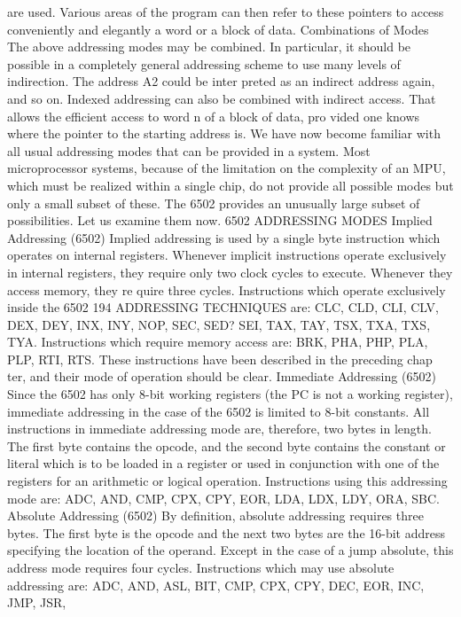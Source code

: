 are used. Various areas of the program can then refer to these
pointers to access conveniently and elegantly a word or a block of
data.
Combinations of Modes
The above addressing modes may be combined. In particular, it
should be possible in a completely general addressing scheme to
use many levels of indirection. The address A2 could be inter
preted as an indirect address again, and so on.
Indexed addressing can also be combined with indirect access.
That allows the efficient access to word n of a block of data, pro
vided one knows where the pointer to the starting address is.
We have now become familiar with all usual addressing modes
that can be provided in a system. Most microprocessor systems,
because of the limitation on the complexity of an MPU, which
must be realized within a single chip, do not provide all possible
modes but only a small subset of these. The 6502 provides an
unusually large subset of possibilities. Let us examine them now.
6502 ADDRESSING MODES
Implied Addressing (6502)
Implied addressing is used by a single byte instruction which
operates on internal registers. Whenever implicit instructions
operate exclusively in internal registers, they require only two
clock cycles to execute. Whenever they access memory, they re
quire three cycles.
Instructions which operate exclusively inside the 6502
194
ADDRESSING TECHNIQUES
are: CLC, CLD, CLI, CLV, DEX, DEY, INX, INY, NOP, SEC, SED?
SEI, TAX, TAY, TSX, TXA, TXS, TYA.
Instructions which require memory access are: BRK, PHA,
PHP, PLA, PLP, RTI, RTS.
These instructions have been described in the preceding chap
ter, and their mode of operation should be clear.
Immediate Addressing (6502)
Since the 6502 has only 8-bit working registers (the PC is not a
working register), immediate addressing in the case of the 6502 is
limited to 8-bit constants. All instructions in immediate addressing
mode are, therefore, two bytes in length. The first byte contains
the opcode, and the second byte contains the constant or literal
which is to be loaded in a register or used in conjunction with one
of the registers for an arithmetic or logical operation.
Instructions using this addressing mode are: ADC, AND, CMP,
CPX, CPY, EOR, LDA, LDX, LDY, ORA, SBC.
Absolute Addressing (6502)
By definition, absolute addressing requires three bytes. The
first byte is the opcode and the next two bytes are the 16-bit
address specifying the location of the operand. Except in the case
of a jump absolute, this address mode requires four cycles.
Instructions which may use absolute addressing are: ADC,
AND, ASL, BIT, CMP, CPX, CPY, DEC, EOR, INC, JMP, JSR,
